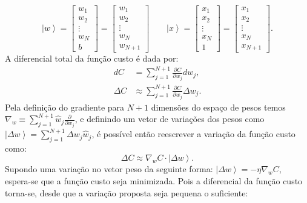 \begin{equation}\left|w\right\rangle =\left[\begin{array}{c}
w_{1}\\
w_{2}\\
\vdots\\
w_{N}\\
b
\end{array}\right]=\left[\begin{array}{c}
w_{1}\\
w_{2}\\
\vdots\\
w_{N}\\
w_{N+1}
\end{array}\right]\qquad\left|x\right\rangle =\left[\begin{array}{c}
x_{1}\\
x_{2}\\
\vdots\\
x_{N}\\
1
\end{array}\right]=\left[\begin{array}{c}
x_{1}\\
x_{2}\\
\vdots\\
x_{N}\\
x_{N+1}
\end{array}\right] . \end{equation}
A diferencial total da função custo é dada por:
\begin{equation}
\begin{split}
dC&=\sum_{j=1}^{N+1}\frac{\partial C}{\partial w_{j}}dw_{j}, \\
\Delta C&\approx\sum_{j=1}^{N+1}\frac{\partial C}{\partial w_{j}}\Delta w_{j}.
\end{split} 
\end{equation}
Pela definição do gradiente para $N+1$ dimensões do espaço de pesos temos $\nabla_w\equiv\sum_{j=1}^{N+1}\widehat{w}_{j}\frac{\partial}{\partial w_{j}}$, e definindo um vetor de variações dos pesos como $\left|\Delta w\right\rangle =\sum_{j=1}^{N+1}\Delta w_{j}\widehat{w}_{j}$,  é possível então reescrever a variação da função custo como:
\begin{equation}\Delta C\approx\nabla_{w}C\cdot\left|\Delta w\right\rangle . \end{equation}
Supondo uma variação no vetor peso da seguinte forma: $\left|\Delta w \right\rangle =-\eta\nabla_{w}C$,  espera-se que a função custo seja minimizada. Pois a diferencial da função custo torna-se, desde que a variação proposta seja pequena o suficiente:
